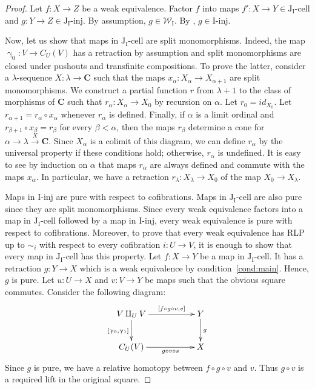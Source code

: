 \documentclass{tac}
\theoremstyle{definition}
\newcommand{\we}{\mathcal{W}}
\newcommand{\cat}[1]{\mathbf{#1}}
\newcommand{\C}{\cat{C}}
\newcommand{\I}{\mathrm{I}}
\newcommand{\J}{\mathrm{J}}
\newcommand{\class}[2]{#1\text{-}\mathrm{#2}}
\newcommand{\Iinj}[1][\I]{\class{#1}{inj}}
\newcommand{\Icell}[1][\I]{\class{#1}{cell}}
\newcommand{\Jinj}[1][]{\Iinj[\J#1]}
\newcommand{\Jcell}[1][]{\Icell[\J#1]}
\newcommand{\cyli}{\upgamma}
\begin{document}
\begin{proof}
Let $f : X \to Z$ be a weak equivalence.
Factor $f$ into maps $f' : X \to Y \in \Jcell[_\I]$ and $g : Y \to Z \in \Jinj[_\I]$.
By assumption, $g \in \we_\I$.
By , $g \in \Iinj$.

Now, let us show that maps in $\Jcell[_\I]$ are split monomorphisms.
Indeed, the map $\cyli_0 : V \to C_U(V)$ has a retraction by assumption and split monomorphisms are closed under pushouts and transfinite compositions.
To prove the latter, consider a $\lambda$-sequence $X : \lambda \to \C$ such that the maps $x_\alpha : X_\alpha \to X_{\alpha+1}$ are split monomorphisms.
We construct a partial function $r$ from $\lambda+1$ to the class of morphisms of $\C$ such that $r_\alpha : X_\alpha \to X_0$ by recursion on $\alpha$.
Let $r_0 = id_{X_0}$.
Let $r_{\alpha+1} = r_\alpha \circ x_\alpha$ whenever $r_\alpha$ is defined.
Finally, if $\alpha$ is a limit ordinal and $r_{\beta+1} \circ x_\beta = r_\beta$ for every $\beta < \alpha$,
then the maps $r_\beta$ determine a cone for $\alpha \to \lambda \xrightarrow{X} \C$.
Since $X_\alpha$ is a colimit of this diagram, we can define $r_\alpha$ by the universal property if these conditions hold; otherwise, $r_\alpha$ is undefined.
It is easy to see by induction on $\alpha$ that maps $r_\alpha$ are always defined and commute with the maps $x_\alpha$.
In particular, we have a retraction $r_\lambda : X_\lambda \to X_0$ of the map $X_0 \to X_\lambda$.

Maps in $\Iinj$ are pure with respect to cofibrations.
Maps in $\Jcell[_\I]$ are also pure since they are split monomorphisms.
Since every weak equivalence factors into a map in $\Jcell[_\I]$ followed by a map in $\Iinj$, every weak equivalence is pure with respect to cofibrations.
Moreover, to prove that every weak equivalence has RLP up to $\sim_i$ with respect to every cofibration $i : U \to V$,
it is enough to show that every map in $\Jcell[_\I]$ has this property.
Let $f : X \to Y$ be a map in $\Jcell[_\I]$.
It has a retraction $g : Y \to X$ which is a weak equivalence by condition~\eqref{cond:main}.
Hence, $g$ is pure.
Let $u : U \to X$ and $v : V \to Y$ be maps such that the obvious square commutes.
Consider the following diagram:
\[ \xymatrix{ V \amalg_U V \ar[rr]^-{[f \circ g \circ v, v]} \ar[d]_{[\cyli_0,\cyli_1]} & & Y \ar[d]^g \\
              C_U(V) \ar[rr]_-{g \circ v \circ s} & & X
            } \]
Since $g$ is pure, we have a relative homotopy between $f \circ g \circ v$ and $v$.
Thus $g \circ v$ is a required lift in the original square.


\end{proof}
\end{document}
